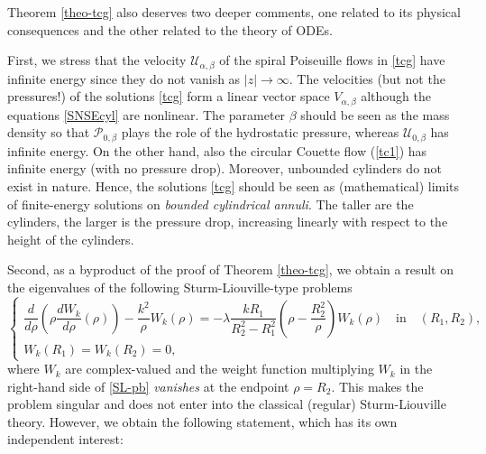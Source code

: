 \documentclass[a4paper,11pt]{amsart}
\numberwithin{equation}{section}
\numberwithin{figure}{section}
\def\U{{\mathcal U}}
\def\P{{\mathcal P}}
\def\eq#1{(\ref{#1})}
\begin{document}
Theorem \ref{theo-tcg} also deserves two deeper comments,
one related to its physical consequences and the other related
to the theory of ODEs.\par
First,	we stress that the velocity $\mathcal{U}_{\alpha, \beta}$ of the spiral Poiseuille flows 
 in \eqref{tcg} have infinite 
energy since they do not vanish as $|z|\to\infty$. The 
velocities (but not the pressures!) of
the solutions \eqref{tcg} form a linear vector space $V_{\alpha, \beta}$ although the equations \eqref{SNSEcyl} are nonlinear. The	parameter $\beta$ should
	be seen as the mass density so that $\P_{0,\beta}$ plays the role of the hydrostatic pressure, whereas $\U_{0,\beta}$ has infinite energy. On the other hand, also the circular Couette flow \eq{tc1}
	has infinite energy (with no pressure drop). Moreover, unbounded cylinders do not exist in nature. Hence, the solutions \eqref{tcg} should be seen as (mathematical) limits of finite-energy solutions on
	{\em bounded cylindrical annuli}. The taller are the cylinders, the larger is the pressure drop, increasing linearly with respect to the height of the cylinders.\par
Second, as a byproduct of the proof of Theorem
\ref{theo-tcg}, we obtain a result on the eigenvalues of
the following Sturm-Liouville-type problems
	\begin{equation}\label{SL-pb}
		\begin{cases}
			\dfrac{d}{d\rho}	\left(\rho \dfrac{d W_k}{d\rho}(\rho) \right) - \dfrac{k^2}{\rho} W_k(\rho)= - \lambda\dfrac{k R_1}{R_2^2-R_1^2}\left(\rho-\dfrac{R_2^2}{\rho}\right) W_k(\rho)  \quad \text{in} \quad (R_1,R_2),\\[10pt]
			W_k(R_1)=  W_k(R_2)=0,
		\end{cases}
	\end{equation} where $W_k$ are complex-valued and the weight function multiplying $W_k$ in the right-hand side of \eqref{SL-pb} \emph{vanishes} at the endpoint $\rho=R_2$. This makes  the problem singular and does not enter into the classical (regular) Sturm-Liouville theory. However, we obtain the following statement, which has its own independent interest:
	
\end{document}
